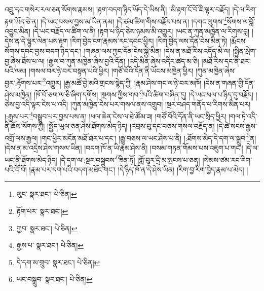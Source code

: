 འབྲུ་དང་གསེར་རལ་ཅན་སོགས་རྣམས། །རྟག་བདག་ཉིད་ཡོད་དེ་ཡིས་ནི། །མི་རྟག་ངོ་བོ་ཇི་ལྟར་བརྗོད། །དེ་ལ་རིག་རྟག་ཡོད་ཅེ་ན། །དེ་ཡང་བསལ་བྱས་མ་ཡིན་ནམ། །དེ་ཙམ་ཚིག་གིས་བརྗོད་པས་ན། །དགང་ལུགས་\footnote{ལུང་  སྣར་ཐང་།  པེ་ཅིན། }སོགས་ལ་བློ་འབྱུང་མིན། །དེ་ཡང་བརྗོད་ལ་ཚིག་ལ་ནི། །རྟག་པ་ཉིད་ཅེས་ཉམས་མི་འགྱུར། །ཡང་ན་ཀུན་མཁྱེན་ལ་རིགས་བླ། །དེས་ན་དེ་ལྷུར་ལེན་པས་རྟག །རིག་བྱེད་ངག་རྣམས་རང་དབང་ཕྱིར། །རིག་བྱེད་ལས་དོན་ངེས་མིན་ཏེ། །རྨོངས་སོགས་དབང་བྱས་བདག་ཉིད་དང་། །གཞན་ལས་ཀྱང་དོན་ངེས་སྐྱེ་མིན། །དེས་ན་མཐོ་རིས་འདོད་མེ་ལ། །སྦྱིན་སྲེག་བྱ་ཞེས་ཐོས་པ་ལ། །རྒྱལ་བ་ཀུན་མཁྱེན་ཞེས་བྱའི་དོན། །འདི་མིན་ཞེས་འདིར་ཚད་མ་ཅི། །མཐོ་རིས་དང་ནི་ཐར་པའི་ལམ། །གསལ་བར་ཉེ་བར་བསྟན་པའི་ཕྱིར། །གཙོ་བོའི་དོན་ནི་ཡོངས་མཁྱེན་ཕྱིར། །ཀུན་མཁྱེན་ཞེས་བྱར་:རྟོགས་པར་\footnote{རྟོག་པར་  སྣར་ཐང་། }འགྱུར། །རྒྱ་མཚོ་བྱེ་མའི་གྲངས་སྙེད་ཀྱི། །རྣམ་ཤེས་གང་ལ་ཉེ་བར་མཁོ། །དེས་ན་གཞན་གྱི་དོན་ཤེས་མཁྱེན། །ཁོ་བོ་ཅག་ལ་ཅི་ཞིག་དགོས། །སྔགས་ཀྱིས་གབ་\footnote{ཀྱབ་  སྣར་ཐང་།  པེ་ཅིན། }པའི་ཚིག་བཞིན་དུ། །དེ་ཡང་ཕལ་པ་ཉིད་དུ་བརྗོད། །ཅེས་བྱ་འདི་ལྟར་ངེས་པ་འདི། །ཀུན་མཁྱེན་ངེས་པར་གསལ་ནས་འགྲུབ། །སྔར་བཤད་གནོད་པ་རིགས་མིན་པར། །:རྒྱས་པར་\footnote{རྒྱས་པ་  སྣར་ཐང་།  པེ་ཅིན། }བསྒྲུབ་པར་བྱས་པས་ན། །ཕལ་ཆེན་ངེས་ལ་ཐེ་ཚོམ་ཟ། །གཙོ་བོའི་དོན་ནི་ཡང་སྲིད་ཕྱིར། །གལ་ཏེ་འདི་ནི་ཆོས་སོགས་ཀྱི། །སྤྱོད་ཡུལ་ཅན་ཤེས་ཐོགས་མེད་ཉིད། །འབྲས་བུ་དང་བཅས་གསལ་བརྗོད་ན། །དེ་ཚེ་སངས་རྒྱས་འགྲོ་ལས་རྒྱལ། །གང་ཕྱིར་མངོན་མཐོ་ཐར་པ་དང་། །རྒྱུ་བཅས་ལ་ཡང་ཤེས་པ་ནི། །:ཐོགས་མེད་དེ་དག་ལ་སྒྲུབ་\footnote{དེ་དག་མ་གྲུབ་  སྣར་ཐང་།  པེ་ཅིན། }ན། །དེས་ན་མ་འདྲེས་ཤེས་གསལ་ཡིན། །བདག་ཁོ་ན་ཡི་རྣམ་ཤེས་ནི། །བསམ་གཏན་གོམས་པས་འཇུག་པ་གང་། །དེ་ལ་ཡང་ནི་ཐོགས་མེད་ཉིད། །དེ་དག་ལ་:སྔར་བསྒྲུབས་\footnote{ཡང་བསྒྲུབ་  སྣར་ཐང་།  པེ་ཅིན། }ཟིན་ཏོ། །གློ་བུར་དྲི་མ་སྤངས་པ་ཅན། །སེམས་ཙམ་རང་རིག་པའི་ངོ་བོ། །རྣམ་པར་དག་པའི་བདག་མཐོང་གང་། །དེ་ཉིད་ཁོ་ན་དེ་ཤེས་ཡིན། །རིག་བྱ་རིག་བྱེད་རྣམ་པ་མེད། །
